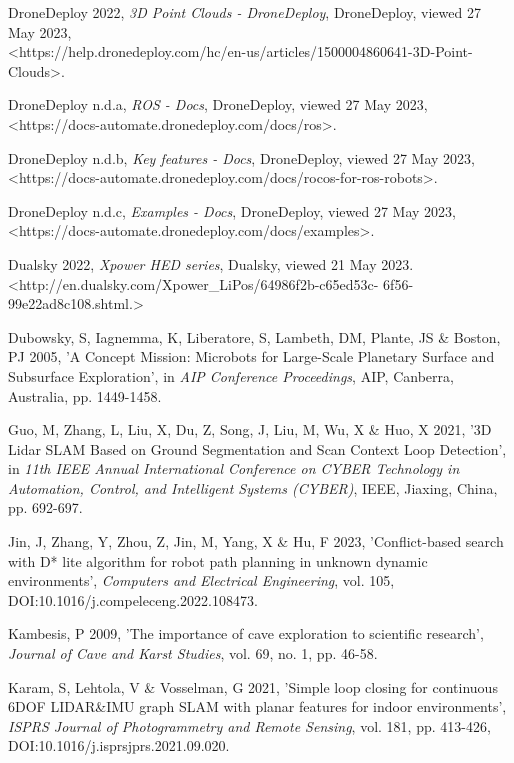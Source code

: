 DroneDeploy 2022, \textit{3D Point Clouds - DroneDeploy}, DroneDeploy, viewed 27 May 2023, \\ \textless https://help.dronedeploy.com/hc/en-us/articles/1500004860641-3D-Point-Clouds\textgreater.

DroneDeploy n.d.a, \textit{ROS - Docs}, DroneDeploy, viewed 27 May 2023, \\ \textless https://docs-automate.dronedeploy.com/docs/ros\textgreater.

DroneDeploy n.d.b, \textit{Key features - Docs}, DroneDeploy, viewed 27 May 2023, \\ \textless https://docs-automate.dronedeploy.com/docs/rocos-for-ros-robots\textgreater.

DroneDeploy n.d.c, \textit{Examples - Docs}, DroneDeploy, viewed 27 May 2023, \\ \textless https://docs-automate.dronedeploy.com/docs/examples\textgreater.

Dualsky 2022, \textit{Xpower HED series}, Dualsky, viewed 21 May 2023. \\ \textless http://en.dualsky.com/Xpower\_LiPos/64986f2b-c65ed53c-
6f56-99e22ad8c108.shtml.\textgreater

Dubowsky, S, Iagnemma, K, Liberatore, S, Lambeth, DM, Plante, JS \& Boston, PJ 2005, 'A Concept Mission: Microbots for Large-Scale Planetary Surface and Subsurface Exploration', in \textit{AIP Conference Proceedings}, AIP, Canberra, Australia, pp. 1449-1458.

Guo, M, Zhang, L, Liu, X, Du, Z, Song, J, Liu, M, Wu, X \& Huo, X 2021, '3D Lidar SLAM Based on Ground Segmentation and Scan Context Loop Detection', in \textit{11th IEEE Annual International Conference on CYBER Technology in Automation, Control, and Intelligent Systems (CYBER)}, IEEE, Jiaxing, China, pp. 692-697.

Jin, J, Zhang, Y, Zhou, Z, Jin, M, Yang, X \& Hu, F 2023, 'Conflict-based search with D* lite algorithm for robot path planning in unknown dynamic environments', \textit{Computers and Electrical Engineering}, vol. 105, DOI:10.1016/j.compeleceng.2022.108473.

Kambesis, P 2009, ’The importance of cave exploration to scientific research’, \textit{Journal of Cave and Karst Studies}, vol. 69, no. 1, pp. 46-58.

Karam, S, Lehtola, V \& Vosselman, G 2021, 'Simple loop closing for continuous 6DOF LIDAR\&IMU graph SLAM with planar features for indoor environments', \textit{ISPRS Journal of Photogrammetry and Remote Sensing}, vol. 181, pp. 413-426, DOI:10.1016/j.isprsjprs.2021.09.020.

